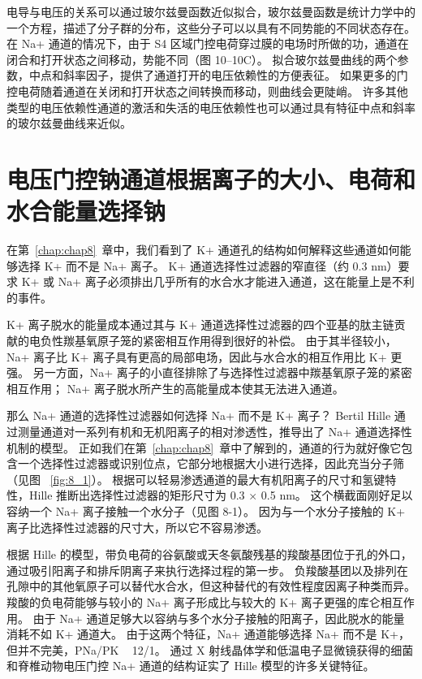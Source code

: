 电导与电压的关系可以通过玻尔兹曼函数近似拟合，玻尔兹曼函数是统计力学中的一个方程，描述了分子群的分布，这些分子可以以具有不同势能的不同状态存在。
在 Na+ 通道的情况下，由于 S4 区域门控电荷穿过膜的电场时所做的功，通道在闭合和打开状态之间移动，势能不同（图 10–10C）。
拟合玻尔兹曼曲线的两个参数，中点和斜率因子，提供了通道打开的电压依赖性的方便表征。
如果更多的门控电荷随着通道在关闭和打开状态之间转换而移动，则曲线会更陡峭。
许多其他类型的电压依赖性通道的激活和失活的电压依赖性也可以通过具有特征中点和斜率的玻尔兹曼曲线来近似。


\section{电压门控钠通道根据离子的大小、电荷和水合能量选择钠}

在第~\ref{chap:chap8}~章中，我们看到了 K+ 通道孔的结构如何解释这些通道如何能够选择 K+ 而不是 Na+ 离子。
K+ 通道选择性过滤器的窄直径（约 0.3 nm）要求 K+ 或 Na+ 离子必须排出几乎所有的水合水才能进入通道，这在能量上是不利的事件。


K+ 离子脱水的能量成本通过其与 K+ 通道选择性过滤器的四个亚基的肽主链贡献的电负性羰基氧原子笼的紧密相互作用得到很好的补偿。
由于其半径较小，Na+ 离子比 K+ 离子具有更高的局部电场，因此与水合水的相互作用比 K+ 更强。
另一方面，Na+ 离子的小直径排除了与选择性过滤器中羰基氧原子笼的紧密相互作用；
Na+ 离子脱水所产生的高能量成本使其无法进入通道。


那么 Na+ 通道的选择性过滤器如何选择 Na+ 而不是 K+ 离子？
Bertil Hille 通过测量通道对一系列有机和无机阳离子的相对渗透性，推导出了 Na+ 通道选择性机制的模型。
正如我们在第~\ref{chap:chap8}~章中了解到的，通道的行为就好像它包含一个选择性过滤器或识别位点，它部分地根据大小进行选择，因此充当分子筛（见图 ~\ref{fig:8_1}）。
根据可以轻易渗透通道的最大有机阳离子的尺寸和氢键特性，Hille 推断出选择性过滤器的矩形尺寸为 0.3 × 0.5 nm。
这个横截面刚好足以容纳一个 Na+ 离子接触一个水分子（见图 8-1）。
因为与一个水分子接触的 K+ 离子比选择性过滤器的尺寸大，所以它不容易渗透。


根据 Hille 的模型，带负电荷的谷氨酸或天冬氨酸残基的羧酸基团位于孔的外口，通过吸引阳离子和排斥阴离子来执行选择过程的第一步。
负羧酸基团以及排列在孔隙中的其他氧原子可以替代水合水，但这种替代的有效性程度因离子种类而异。
羧酸的负电荷能够与较小的 Na+ 离子形成比与较大的 K+ 离子更强的库仑相互作用。
由于 Na+ 通道足够大以容纳与多个水分子接触的阳离子，因此脱水的能量消耗不如 K+ 通道大。
由于这两个特征，Na+ 通道能够选择 Na+ 而不是 K+，但并不完美，PNa/PK ~ 12/1。
通过 X 射线晶体学和低温电子显微镜获得的细菌和脊椎动物电压门控 Na+ 通道的结构证实了 Hille 模型的许多关键特征。



